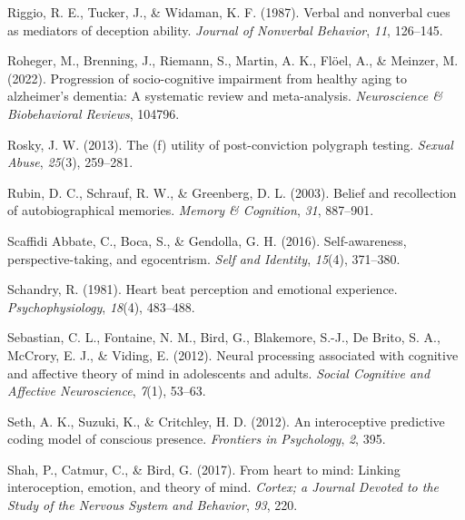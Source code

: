 \documentclass[
  man,mask,floatsintext]{apa6}
\newlength{\cslhangindent}
\newlength{\cslentryspacingunit} %
\newenvironment{CSLReferences}[2] %
 {%
  \setlength{\parindent}{0pt}
  \ifodd #1
  \let\oldpar\par
  \def\par{\hangindent=\cslhangindent\oldpar}
  \fi
  \setlength{\parskip}{#2\cslentryspacingunit}
 }%
 {}
\begin{document}
\begin{CSLReferences}{1}{0}
\leavevmode{}%
Riggio, R. E., Tucker, J., \& Widaman, K. F. (1987). Verbal and nonverbal cues as mediators of deception ability. \emph{Journal of Nonverbal Behavior}, \emph{11}, 126--145.

\leavevmode{}%
Roheger, M., Brenning, J., Riemann, S., Martin, A. K., Flöel, A., \& Meinzer, M. (2022). Progression of socio-cognitive impairment from healthy aging to alzheimer's dementia: A systematic review and meta-analysis. \emph{Neuroscience \& Biobehavioral Reviews}, 104796.

\leavevmode{}%
Rosky, J. W. (2013). The (f) utility of post-conviction polygraph testing. \emph{Sexual Abuse}, \emph{25}(3), 259--281.

\leavevmode{}%
Rubin, D. C., Schrauf, R. W., \& Greenberg, D. L. (2003). Belief and recollection of autobiographical memories. \emph{Memory \& Cognition}, \emph{31}, 887--901.

\leavevmode{}%
Scaffidi Abbate, C., Boca, S., \& Gendolla, G. H. (2016). Self-awareness, perspective-taking, and egocentrism. \emph{Self and Identity}, \emph{15}(4), 371--380.

\leavevmode{}%
Schandry, R. (1981). Heart beat perception and emotional experience. \emph{Psychophysiology}, \emph{18}(4), 483--488.

\leavevmode{}%
Sebastian, C. L., Fontaine, N. M., Bird, G., Blakemore, S.-J., De Brito, S. A., McCrory, E. J., \& Viding, E. (2012). Neural processing associated with cognitive and affective theory of mind in adolescents and adults. \emph{Social Cognitive and Affective Neuroscience}, \emph{7}(1), 53--63.

\leavevmode{}%
Seth, A. K., Suzuki, K., \& Critchley, H. D. (2012). An interoceptive predictive coding model of conscious presence. \emph{Frontiers in Psychology}, \emph{2}, 395.

\leavevmode{}%
Shah, P., Catmur, C., \& Bird, G. (2017). From heart to mind: Linking interoception, emotion, and theory of mind. \emph{Cortex; a Journal Devoted to the Study of the Nervous System and Behavior}, \emph{93}, 220.


\end{CSLReferences}
\end{document}
